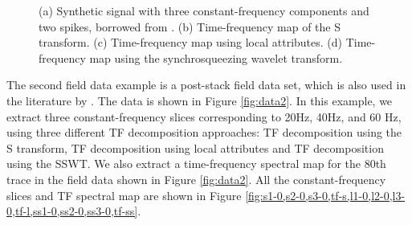 \begin{figure}[htb!]
  \centering
	\caption{(a) Synthetic signal with three constant-frequency components and two spikes, borrowed from \cite[]{guochang20112}. (b) Time-frequency map of the S transform. (c) Time-frequency map using local attributes. (d) Time-frequency map using the synchrosqueezing wavelet transform.}
   \label{fig:s-0,st-0,proj-0,gch1-tfsswt}
\end{figure}


The second field data example is a post-stack field data set, which is also used in the literature by \cite{guochang20112}. The data is shown in Figure \ref{fig:data2}. In this example, we extract three constant-frequency slices corresponding to 20Hz, 40Hz, and 60 Hz, using three different TF decomposition approaches: TF decomposition using the S transform, TF decomposition using local attributes and TF decomposition using the SSWT. We also extract a time-frequency spectral map for the 80th trace in the field data shown in Figure \ref{fig:data2}. All the constant-frequency slices and TF spectral map are shown in Figure \ref{fig:s1-0,s2-0,s3-0,tf-s,l1-0,l2-0,l3-0,tf-l,ss1-0,ss2-0,ss3-0,tf-ss}.

